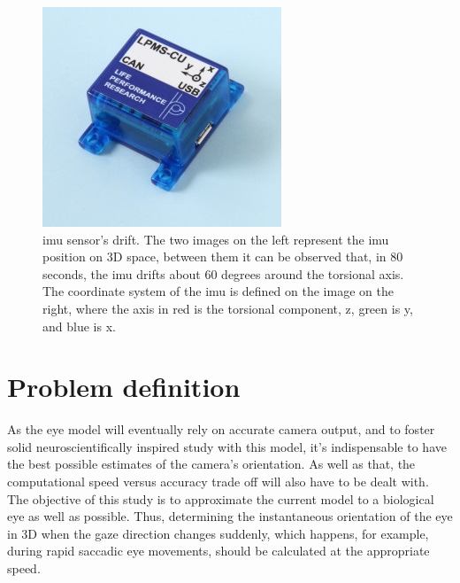 \begin{figure}[ht]
\begin{minipage}[b]{0.3\linewidth}
	\end{minipage}
	\hspace{0.5cm}
	\begin{minipage}[b]{0.3\linewidth}
		\centering
		\includegraphics[width=\textwidth]{images/lpmscu.jpg}
	\end{minipage}
	\caption[ \acrshort{imu} sensor's drift]{ \acrshort{imu} sensor's drift. The two images on the left represent the  \acrshort{imu} position on 3D space, between them it can be observed that, in 80 seconds, the  \acrshort{imu} drifts about 60 degrees around the torsional axis. The coordinate system of the  \acrshort{imu} is defined on the image on the right, where the axis in red is the torsional component, z, green is y, and blue is x.}
	\label{cha1:sec1:fig:imu}
\end{figure}

\section{Problem definition}
\label{cha1:problemdef}
As the eye model will eventually rely on accurate camera output, and to foster solid neuroscientifically inspired study with this model, it's indispensable to have the best possible estimates of the camera's orientation. As well as that, the computational speed versus accuracy trade off will also have to be dealt with. The objective of this study is to approximate the current model to a biological eye as well as possible. Thus, determining the instantaneous orientation of the eye in 3D when the gaze direction changes suddenly, which happens, for example, during rapid saccadic eye movements, should be calculated at the appropriate speed.

